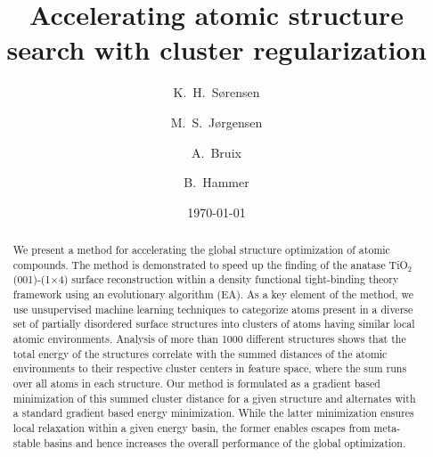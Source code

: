 \documentclass[aip,amsmath,amssymb,reprint]{revtex4-1}
\begin{document}
\title[]{Accelerating atomic structure search with cluster regularization}%

\author{K.\ H.\ S{\o}rensen}
\author{M.\ S.\ J{\o}rgensen}
\author{A.\ Bruix}
\author{B.\ Hammer}
 
\date{\today}%

\begin{abstract}
We present a method for accelerating the global structure optimization
of atomic compounds. The method is demonstrated to speed up the
finding of the anatase TiO$_2$(001)-(1$\times$4) surface
reconstruction within a density functional tight-binding theory
framework using an evolutionary algorithm (EA). As a key element of the
method, we use unsupervised machine learning techniques to categorize
atoms present in a diverse set of partially disordered surface structures
into clusters of atoms having similar local atomic
environments. Analysis of more than 1000 different structures shows
that the total energy of the structures correlate with the summed
distances of the atomic environments to their
respective cluster centers in feature space, where the sum runs over all atoms in each
structure. Our method is formulated as a gradient based minimization
of this summed cluster distance for a given structure and alternates
with a standard gradient based energy minimization. While the latter
minimization ensures local relaxation within a given energy basin,
the former enables escapes from meta-stable basins and hence increases
the overall performance of the global optimization.
\end{abstract}

\maketitle
\end{document}
